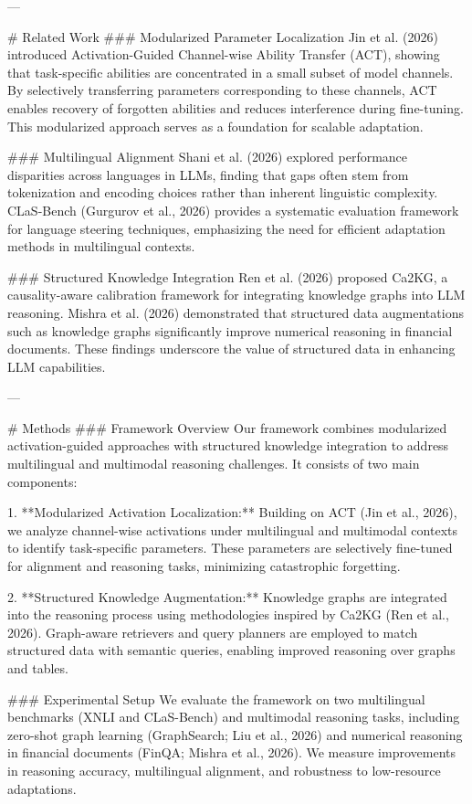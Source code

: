 ---

# Related Work  
### Modularized Parameter Localization  
Jin et al. (2026) introduced Activation-Guided Channel-wise Ability Transfer (ACT), showing that task-specific abilities are concentrated in a small subset of model channels. By selectively transferring parameters corresponding to these channels, ACT enables recovery of forgotten abilities and reduces interference during fine-tuning. This modularized approach serves as a foundation for scalable adaptation.

### Multilingual Alignment  
Shani et al. (2026) explored performance disparities across languages in LLMs, finding that gaps often stem from tokenization and encoding choices rather than inherent linguistic complexity. CLaS-Bench (Gurgurov et al., 2026) provides a systematic evaluation framework for language steering techniques, emphasizing the need for efficient adaptation methods in multilingual contexts.

### Structured Knowledge Integration  
Ren et al. (2026) proposed Ca2KG, a causality-aware calibration framework for integrating knowledge graphs into LLM reasoning. Mishra et al. (2026) demonstrated that structured data augmentations such as knowledge graphs significantly improve numerical reasoning in financial documents. These findings underscore the value of structured data in enhancing LLM capabilities.

---

# Methods  
### Framework Overview  
Our framework combines modularized activation-guided approaches with structured knowledge integration to address multilingual and multimodal reasoning challenges. It consists of two main components:  

1. **Modularized Activation Localization:**  
   Building on ACT (Jin et al., 2026), we analyze channel-wise activations under multilingual and multimodal contexts to identify task-specific parameters. These parameters are selectively fine-tuned for alignment and reasoning tasks, minimizing catastrophic forgetting.  

2. **Structured Knowledge Augmentation:**  
   Knowledge graphs are integrated into the reasoning process using methodologies inspired by Ca2KG (Ren et al., 2026). Graph-aware retrievers and query planners are employed to match structured data with semantic queries, enabling improved reasoning over graphs and tables.  

### Experimental Setup  
We evaluate the framework on two multilingual benchmarks (XNLI and CLaS-Bench) and multimodal reasoning tasks, including zero-shot graph learning (GraphSearch; Liu et al., 2026) and numerical reasoning in financial documents (FinQA; Mishra et al., 2026). We measure improvements in reasoning accuracy, multilingual alignment, and robustness to low-resource adaptations.  

